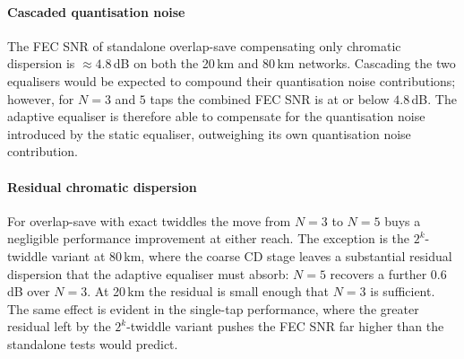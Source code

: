 \documentclass[12pt,a4paper]{article}
\begin{document}
\paragraph{Cascaded quantisation noise} The FEC SNR of standalone overlap-save compensating only chromatic dispersion is $\approx 4.8$\,dB on both the 20\,km and 80\,km networks. Cascading the two equalisers would be expected to compound their quantisation noise contributions; however, for $N=3$ and $5$ taps the combined FEC SNR is at or below $4.8$\,dB. The adaptive equaliser is therefore able to compensate for the quantisation noise introduced by the static equaliser, outweighing its own quantisation noise contribution.

\paragraph{Residual chromatic dispersion} For overlap-save with exact twiddles the move from $N=3$ to $N=5$ buys a negligible performance improvement at either reach. The exception is the $2^k$-twiddle variant at 80\,km, where the coarse CD stage leaves a substantial residual dispersion that the adaptive equaliser must absorb: $N=5$ recovers a further $0.6$\,dB over $N=3$. At 20\,km the residual is small enough that $N=3$ is sufficient. The same effect is evident in the single-tap performance, where the greater residual left by the $2^k$-twiddle variant pushes the FEC SNR far higher than the standalone tests would predict.
\end{document}
